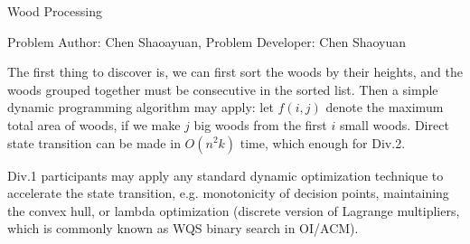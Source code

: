 \begin{Solution}{Wood Processing}

\begin{frame}{\ProblemName}

\small Problem Author: Chen Shaoayuan, Problem Developer: Chen Shaoyuan \par \vspace{0.3cm}


The first thing to discover is, we can first sort the woods by their heights, and the woods grouped together must be consecutive in the sorted list. Then a simple dynamic programming algorithm may apply: let $f(i, j)$ denote the maximum total area of woods, if we make $j$ big woods from the first $i$ small woods. Direct state transition can be made in $O(n^2k)$ time, which enough for Div.2.

\pause

Div.1 participants may apply any standard dynamic optimization technique to accelerate the state transition, e.g. monotonicity of decision points, maintaining the convex hull, or lambda optimization (discrete version of Lagrange multipliers, which is commonly known as WQS binary search in OI/ACM).

\end{frame}

\end{Solution}
